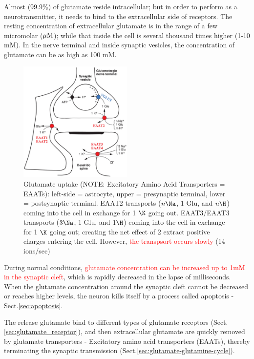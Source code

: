 Almost (99.9\%) of glutamate reside intracellular; but in order to perform as a
neurotransmitter, it needs to bind to the extracellular side of receptors. The
resting concentration of extracellular glutamate is in the range of a few
micromolar (${\mu\text{M}}$); while that inside the cell is several thousand times
higher (1-10 mM). In the nerve terminal and inside synaptic vesicles, the
concentration of glutamate can be as high as 100 mM.

\begin{figure}[htbp]
  \centerline{\includegraphics[height=6cm]{./images/Glutamate_uptake.eps}}
  \caption{Glutamate uptake (NOTE: Excitatory Amino Acid Transporters =
EAATs): left-side = astrocyte,
  upper = presynaptic terminal, lower =
  postsynaptic terminal. EAAT2 transports ($n \Na$, 1 Glu, and $n \H$)
  coming into the cell in exchange for 1 $\K$ going out. EAAT3/EAAT3 transports
  ($3 \Na$, 1 Glu, and $1 \H$) coming into the cell in exchange for 1 $\K$
  going out; creating the net effect of 2 extract positive charges entering the cell.
  However, \textcolor{red}{the transpsort occurs slowly} (14 ions/sec) 
  }\label{fig:Glutamate_uptake}
\end{figure}

\begin{mdframed}

During normal conditions, \textcolor{red}{glutamate concentration can be
increased up to 1mM in the synaptic cleft}, which is rapidly decreased in the
lapse of milliseconds. When the glutamate concentration around the synaptic
cleft cannot be decreased or reaches higher levels, the neuron kills itself by a
process called apoptosis - Sect.\ref{sec:apoptosis}.

\end{mdframed}


The release glutamate bind to different types of glutamate receptors
(Sect.\ref{sec:glutamate_receptor}), and then extracellular glutamate are
quickly removed by glutamate transporters - Excitatory amino acid transporters
(EAATs), thereby terminating the synaptic transmission
(Sect.\ref{sec:glutamate-glutamine-cycle}).

